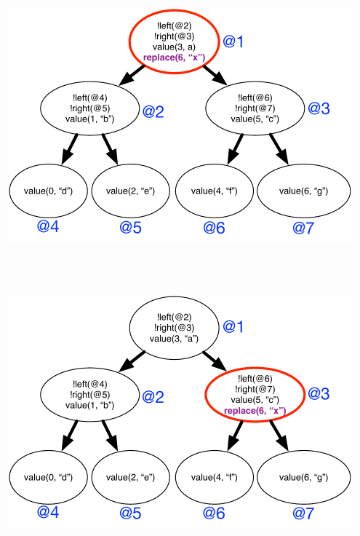\begin{figure}[h]
        \centering
        \begin{subfigure}[b]{0.5\textwidth}
                \includegraphics[width=\textwidth]{figures/btree/btree_trace1}
                \label{fig:language:btree_trace1}
        \end{subfigure}%
        ~
        \begin{subfigure}[b]{0.5\textwidth}
                \includegraphics[width=\textwidth]{figures/btree/btree_trace2}



\end{subfigure}
\end{figure}

